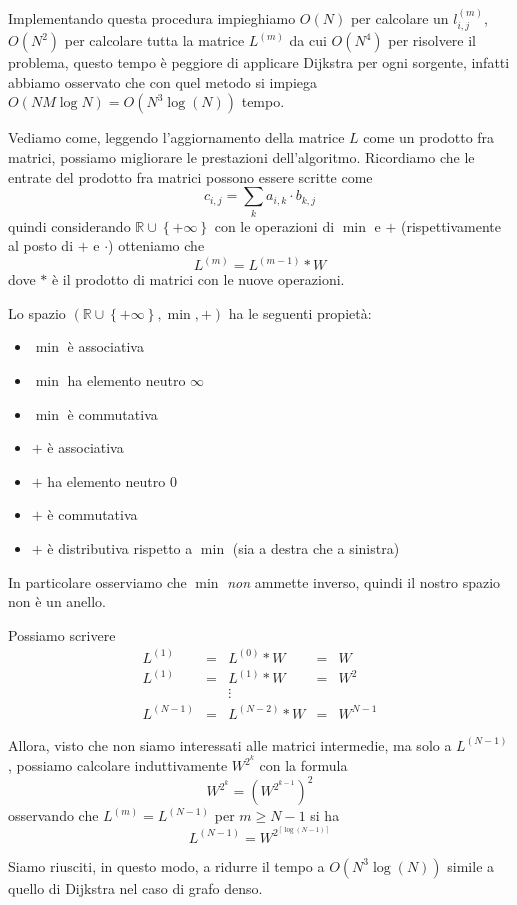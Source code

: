 \documentclass[a4paper,10pt]{amsbook}
\theoremstyle{plain}
\theoremstyle{definition}
\theoremstyle{remark}
\newcommand{\set}[1]{\left\{#1\right\}}
\newcommand{\pa}[1]{\left(#1\right)}
\newcommand{\ceil}[1]{\left\lceil#1\right\rceil}
\begin{document}
Implementando questa procedura impieghiamo $O(N)$ per calcolare un
$l^{(m)}_{i,j}$, $O(N^2)$ per calcolare tutta la matrice $L^{(m)}$ da
cui $O(N^4)$ per risolvere il problema, questo tempo è peggiore di
applicare Dijkstra per ogni sorgente, infatti abbiamo osservato che
con quel metodo si impiega $O(NM\log N) = O( N^3 \log (N) )$ tempo.

Vediamo come, leggendo l'aggiornamento della matrice $L$ come un
prodotto fra matrici, possiamo migliorare le prestazioni
dell'algoritmo. Ricordiamo che le entrate del prodotto fra matrici
possono essere scritte come
\[ c_{i,j} = \sum _k a_{i,k} \cdot b_{k,j} \] quindi considerando
$\mathbb{R}\cup \set{+\infty}$ con le operazioni di $\min$ e $+$
(rispettivamente al posto di $+$ e $\cdot$) otteniamo che
\[ L^{(m)} = L^{(m-1)} * W \]
dove $*$ è il prodotto di matrici con le nuove operazioni.

Lo spazio $\pa{\mathbb{R}\cup \set{+\infty} ,\min,+}$ ha le seguenti
propietà:
\begin{itemize}
\item $\min$ è associativa
\item $\min$ ha elemento neutro $\infty$
\item $\min$ è commutativa
\item $+$ è associativa
\item $+$ ha elemento neutro $0$
\item $+$ è commutativa
\item $+$ è distributiva rispetto a $\min$ (sia a destra che a sinistra)
\end{itemize}
In particolare osserviamo che $\min$ \emph{non} ammette inverso,
quindi il nostro spazio non \`e un anello.


Possiamo scrivere
\begin{align*}
  L^{(1)} & = & L^{(0)} * W & = & W \\
  L^{(1)} & = & L^{(1)} * W & = & W^2 \\
  & & \vdots & & \\
  L^{(N-1)} & = & L^{(N-2)} * W & = & W^{N-1} 
\end{align*}

Allora, visto che non siamo interessati alle matrici intermedie, ma
solo a $L^{(N-1)}$, possiamo calcolare induttivamente $W^{2^k}$ con la
formula
\[ W ^{2^k} = \pa{W ^{2^{k-1}}} ^2 \]
osservando che $L^{(m)} = L^{(N-1)}$ per $m \ge N-1$ si ha
\[ L^{(N-1)} = W^{2 ^{\ceil {\log \pa{ N-1} } } } \]

Siamo riusciti, in questo modo, a ridurre il tempo a $O\pa{ N^3 \log
  (N)}$
simile a quello di Dijkstra nel caso di grafo denso.
\end{document}
